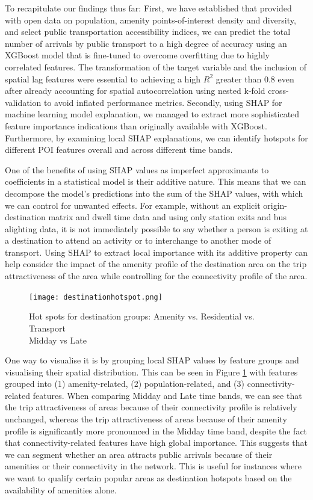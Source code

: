 To recapitulate our findings thus far: First, we have established that provided with open data on population, amenity points-of-interest density and diversity, and select public transportation accessibility indices, we can predict the total number of arrivals by public transport to a high degree of accuracy using an XGBoost model that is fine-tuned to overcome overfitting due to highly correlated features. The transformation of the target variable and the inclusion of spatial lag features were essential to achieving a high $R^2$ greater than 0.8 even after already accounting for spatial autocorrelation using nested k-fold cross-validation to avoid inflated performance metrics. Secondly, using SHAP for machine learning model explanation, we managed to extract more sophisticated feature importance indications than originally available with XGBoost. Furthermore, by examining local SHAP explanations, we can identify hotspots for different POI features overall and across different time bands. 

One of the benefits of using SHAP values as imperfect approximants to coefficients in a statistical model is their additive nature. This means that we can decompose the model's predictions into the sum of the SHAP values, with which we can control for unwanted effects. For example, without an explicit origin-destination matrix and dwell time data and using only station exits and bus alighting data, it is not immediately possible to say whether a person is exiting at a destination to attend an activity or to interchange to another mode of transport. Using SHAP to extract local importance with its additive property can help consider the impact of the amenity profile of the destination area on the trip attractiveness of the area while controlling for the connectivity profile of the area. 

\begin{figure}[!ht]
    \centering
    \texttt{[image: destinationhotspot.png]}
    \captionsetup{justification=centering}
    \caption{Hot spots for destination groups: Amenity vs. Residential vs. Transport\\ Midday vs Late}
    \label{fig:destinationhotspot}
\end{figure}

One way to visualise it is by grouping local SHAP values by feature groups and visualising their spatial distribution. This can be seen in Figure \ref{fig:destinationhotspot} with features grouped into (1) amenity-related, (2) population-related, and (3) connectivity-related features. When comparing Midday and Late time bands, we can see that the trip attractiveness of areas because of their connectivity profile is relatively unchanged, whereas the trip attractiveness of areas because of their amenity profile is significantly more pronounced in the Midday time band, despite the fact that connectivity-related features have high global importance. This suggests that we can segment whether an area attracts public arrivals because of their amenities or their connectivity in the network. This is useful for instances where we want to qualify certain popular areas as destination hotspots based on the availability of amenities alone. 

